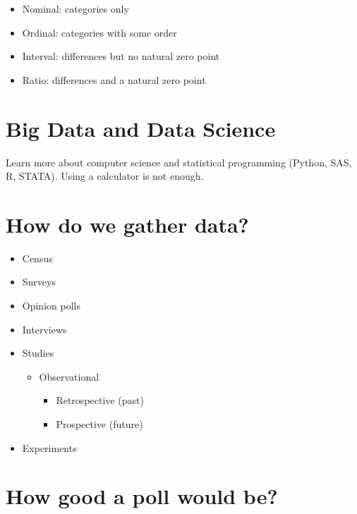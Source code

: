 \documentclass[]{book}
\providecommand{\tightlist}{%
  \setlength{\itemsep}{0pt}\setlength{\parskip}{0pt}}
\begin{document}
\begin{itemize}
\tightlist
\item
  Nominal: categories only
\item
  Ordinal: categories with some order
\item
  Interval: differences but no natural zero point
\item
  Ratio: differences and a natural zero point
\end{itemize}

\hypertarget{big-data-and-data-science}{%
\section{Big Data and Data Science}\label{big-data-and-data-science}}

Learn more about computer science and statistical programming (Python, SAS, R, STATA). Using a calculator is not enough.

\hypertarget{how-do-we-gather-data}{%
\section{How do we gather data?}\label{how-do-we-gather-data}}

\begin{itemize}
\tightlist
\item
  Census
\item
  Surveys
\item
  Opinion polls
\item
  Interviews
\item
  Studies

  \begin{itemize}
  \tightlist
  \item
    Observational

    \begin{itemize}
    \tightlist
    \item
      Retrospective (past)
    \item
      Prospective (future)
    \end{itemize}
  \end{itemize}
\item
  Experiments
\end{itemize}

\hypertarget{how-good-a-poll-would-be}{%
\section{How good a poll would be?}\label{how-good-a-poll-would-be}}
\end{document}
